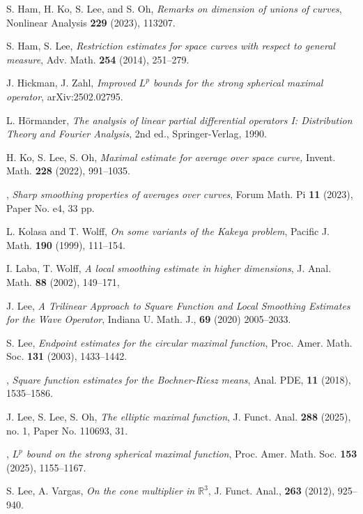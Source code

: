 \documentclass[10pt] %
{amsart}
\theoremstyle{plain}
\numberwithin{equation}{section}
\begin{document}
\begin{thebibliography}{}
 S. Ham, H. Ko, S. Lee, and S. Oh, \textit{Remarks on dimension of unions of curves}, Nonlinear Analysis {\bf 229} (2023), 113207.

 S. Ham, S. Lee, \textit{Restriction estimates for space curves with respect to general measure}, Adv.
Math. \textbf{254} (2014), 251--279.



 J. Hickman, J. Zahl, \textit{Improved $L^p$ bounds for the strong spherical maximal operator}, arXiv:2502.02795.

 L. H\"ormander, 
\textit{The analysis of linear partial differential operators I: Distribution Theory and
Fourier Analysis}, 2nd ed., Springer-Verlag, 1990.



 H. Ko, S. Lee, S. Oh, \textit{Maximal estimate for average over space curve,}  Invent. Math. {\bf 228} (2022),  991--1035.

 \bysame, \textit{Sharp smoothing properties of averages over curves},  Forum Math. Pi \textbf{11} (2023), Paper No. e4, 33 pp.
	
  L. Kolasa and T. Wolff, \textit{On some variants of the Kakeya problem}, Pacific J. Math. \textbf{190} (1999),  111--154.  

 I. Laba, T. Wolﬀ, \textit{A local smoothing estimate in higher dimensions}, J. Anal. Math. \textbf{88} (2002), 149--171,

 J. Lee, \textit{A Trilinear Approach to Square Function and Local Smoothing Estimates for the Wave Operator}, Indiana U. Math. J., {\bf 69}  (2020)  2005--2033. 
 
 S. Lee, \textit{Endpoint estimates for the circular maximal function}, Proc. Amer. Math. Soc. {\bf 131} (2003), 1433--1442.
	
 \bysame, \textit{Square function estimates for the Bochner-Riesz means}, Anal. PDE,  {\bf 11} (2018), 1535--1586.

 J. Lee, S. Lee, S. Oh, \textit{The elliptic maximal function}, J. Funct. Anal.  \textbf{288} (2025), no. 1, Paper No. 110693, 31.  

 \bysame, \textit{$L^p$ bound on the strong spherical maximal function}, Proc. Amer. Math. Soc. \textbf{153} (2025), 1155--1167.
 
 S. Lee, A. Vargas, \textit{On the cone multiplier in $\mathbb R^3$}, J. Funct. Anal., {\bf 263} (2012), 925--940.


\end{thebibliography}
\end{document}
